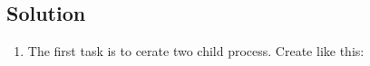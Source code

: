 \documentclass[]{article}
\begin{document}
\subsection*{Solution}
\begin{enumerate}
    \item The first task is to cerate two child process. Create like this:\par


\end{enumerate}
\end{document}
